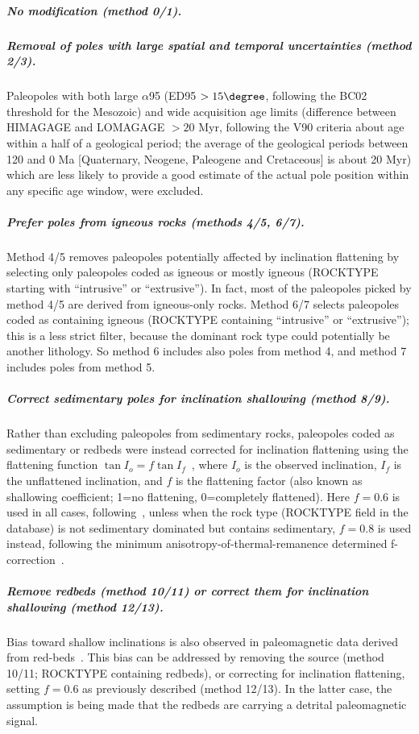 \subparagraph{No modification (method 0/1).}

\subparagraph{Removal of poles with large spatial and temporal uncertainties
(method 2/3).} Paleopoles with both large $\alpha$95 (ED95 $>15\degree$,
following the BC02 threshold for the Mesozoic) and wide acquisition age limits
(difference between HIMAGAGE and LOMAGAGE $>20$ Myr, following the V90 criteria
about age within a half of a geological period; the average of the geological
periods between 120 and 0 Ma [Quaternary, Neogene, Paleogene and Cretaceous] is
about 20 Myr) which are less likely to provide a good estimate of the actual
pole position within any specific age window, were excluded.

\subparagraph{Prefer poles from igneous rocks (methods 4/5, 6/7).} Method 4/5
removes paleopoles potentially affected by inclination flattening by selecting
only paleopoles coded as igneous or mostly igneous (ROCKTYPE starting with
``intrusive'' or ``extrusive''). In fact, most of the paleopoles picked by
method 4/5 are derived from igneous-only rocks. Method 6/7 selects paleopoles
coded as containing igneous (ROCKTYPE containing ``intrusive'' or
``extrusive''); this is a less strict filter, because the dominant rock type
could potentially be another lithology. So method 6 includes also poles from
method 4, and method 7 includes poles from method 5.

\subparagraph{Correct sedimentary poles for inclination shallowing (method
8/9).} Rather than excluding paleopoles from sedimentary rocks, paleopoles coded
as sedimentary or redbeds were instead corrected for inclination flattening
using the flattening function $\tan I_o = f \tan I_f$~\cite{K55}, where $I_o$ is
the observed inclination, $I_f$ is the unflattened inclination, and $f$ is the
flattening factor (also known as shallowing coefficient; 1=no flattening,
0=completely flattened). Here $f=0.6$ is used in all cases,
following~\cite{T12}, unless when the rock type (ROCKTYPE field in the database)
is not sedimentary dominated but contains sedimentary, $f=0.8$ is used instead,
following the minimum anisotropy-of-thermal-remanence determined
f-correction~\cite{D11,Do11}.

\subparagraph{Remove redbeds (method 10/11) or correct them for inclination
shallowing (method 12/13).} Bias toward shallow inclinations is also observed
in paleomagnetic data derived from red-beds~\cite[e.g., in central Asia,
Mediterranean region, North America, etc.]{T04,K04,T07,B10}. This bias can be
addressed by removing the source (method 10/11; ROCKTYPE containing redbeds), or
correcting for inclination flattening, setting $f=0.6$ as previously described
(method 12/13). In the latter case, the assumption is being made that the
redbeds are carrying a detrital paleomagnetic signal.

